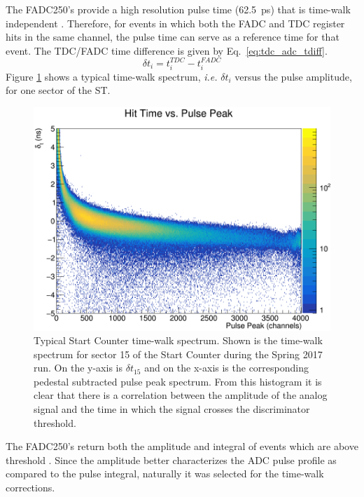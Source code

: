 The FADC250's provide a high resolution pulse time (62.5~ps) that is time-walk independent \cite{pooser16} \cite{dong_fadc}.  Therefore, for events in which both the FADC and TDC register hits in the same channel, the pulse time can serve as a reference time for that event.  The TDC/FADC time difference is given by Eq.~\ref{eq:tdc_adc_tdiff}.
	\begin{equation} \label{eq:tdc_adc_tdiff}
		\delta t_{i} = t^{TDC}_{i} - t^{FADC}_{i}
	\end{equation}
Figure \ref{fig:twdistuncorrch15} shows a typical time-walk spectrum, \textit{i.e.} $\delta t_{i}$ versus the pulse amplitude, for one sector of the ST.
	\begin{figure}[!htb]
		\centering
		\includegraphics[width=1.0\columnwidth]{calibration/figs/tw_dist_uncorr_ch15}
		\caption{Typical Start Counter time-walk spectrum.  Shown is the time-walk spectrum for sector 15 of the Start Counter during the Spring 2017 run. On the y-axis is $\delta t_{15}$ and on the x-axis is the corresponding pedestal subtracted pulse peak spectrum. From this histogram it is clear that there is a correlation between the amplitude of the analog signal and the time in which the signal crosses the discriminator threshold.}
		\label{fig:twdistuncorrch15}
	\end{figure}
The FADC250's return both the amplitude and integral of events which are above threshold \cite{dong_fadc}.  Since the amplitude better characterizes the ADC pulse profile as compared to the pulse integral, naturally it was selected for the time-walk corrections.


